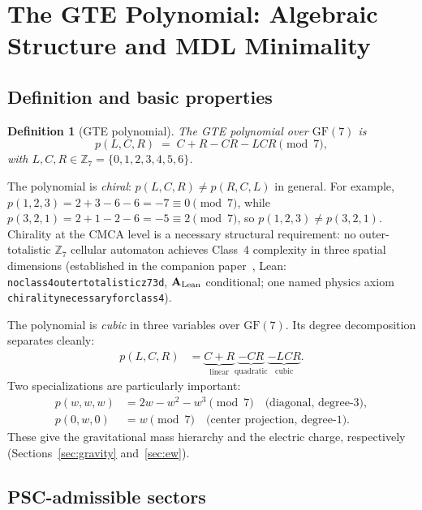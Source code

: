 \documentclass[11pt]{article}
\newtheorem{definition}[theorem]{Definition}
\theoremstyle{remark}
\newcommand{\ZS}{\mathbb{Z}_7}
\newcommand{\lean}[1]{%
  \penalty-100
  \begingroup\def\_{\textunderscore\allowbreak}\texttt{#1}\endgroup}
\newcommand{\GFseven}{\mathrm{GF}(7)}
\newcommand{\CatAL}{\ensuremath{\textbf{A}_{\rm Lean}}}
\begin{document}
\section{The GTE Polynomial: Algebraic Structure and MDL Minimality}
\label{sec:polynomial}

\subsection{Definition and basic properties}
\label{ssec:poly_def}

\begin{definition}[GTE polynomial]
The GTE polynomial over $\GFseven$ is
\[
  p(L,C,R) \;=\; C + R - CR - LCR \pmod{7},
\]
with $L,C,R \in \ZS = \{0,1,2,3,4,5,6\}$.
\end{definition}

The polynomial is \emph{chiral}: $p(L,C,R) \neq p(R,C,L)$ in general.
For example, $p(1,2,3) = 2+3-6-6 = -7 \equiv 0\pmod7$, while
$p(3,2,1) = 2+1-2-6 = -5 \equiv 2\pmod7$, so $p(1,2,3)\neq p(3,2,1)$.
Chirality at the CMCA level is a necessary structural requirement: no outer-totalistic
$\ZS$ cellular automaton achieves Class~4 complexity in three spatial dimensions
(established in the companion paper~\cite{SpivackThreeTapeCMCA}, Lean:
\lean{no\_class4\_outer\_totalistic\_z7\_3d}, $\CatAL$ conditional; one named physics
axiom \lean{chirality\_necessary\_for\_class4}).

The polynomial is \emph{cubic} in three variables over $\GFseven$. Its degree
decomposition separates cleanly:
\begin{align}
  p(L,C,R) &= \underbrace{C+R}_{\text{linear}} \underbrace{-CR}_{\text{quadratic}}
               \underbrace{-LCR}_{\text{cubic}}.
\end{align}
Two specializations are particularly important:
\begin{align}
  \label{eq:diagonal}
  p(w,w,w) &= 2w - w^2 - w^3 \pmod{7} \quad \text{(diagonal, degree-3)},\\
  \label{eq:center}
  p(0,w,0) &= w \pmod{7} \quad \text{(center projection, degree-1)}.
\end{align}
These give the gravitational mass hierarchy and the electric charge, respectively
(Sections~\ref{sec:gravity} and~\ref{sec:ew}).

\subsection{PSC-admissible sectors}
\label{ssec:psc}
\end{document}
